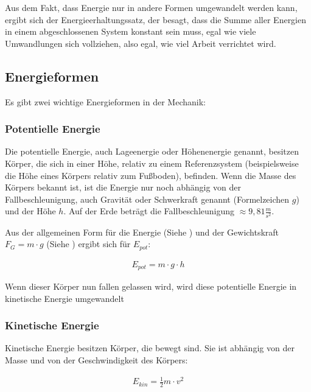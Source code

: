 Aus dem Fakt, dass Energie nur in andere Formen umgewandelt werden kann, ergibt sich der Energieerhaltungssatz, der besagt, dass die Summe aller Energien in einem abgeschlossenen System konstant sein muss, egal wie viele Umwandlungen sich vollziehen, also egal, wie viel Arbeit verrichtet wird. 


\subsection{Energieformen}	\label{subsec:Energieformen}

Es gibt zwei wichtige Energieformen in der Mechanik:

\subsubsection{Potentielle Energie}

Die potentielle Energie, auch Lageenergie oder Höhenenergie genannt, besitzen Körper, die sich in einer Höhe, relativ zu einem Referenzsystem (beispielsweise die Höhe eines Körpers relativ zum Fußboden), befinden. Wenn die Masse des Körpers bekannt ist, ist die Energie nur noch abhängig von der Fallbeschleunigung, auch Gravität oder Schwerkraft genannt (Formelzeichen $g$) und der Höhe $h$. Auf der Erde beträgt die Fallbeschleunigung $\approx 9,81 \frac{m}{s^2}$.

Aus der allgemeinen Form für die Energie (Siehe ) und der Gewichtskraft $F_G = m \cdot g$ (Siehe ) ergibt sich für $E_{pot}$:

\begin{align} \label{eq:epot}
	E_{pot} = m \cdot g \cdot h
\end{align}

\noindent Wenn dieser Körper nun fallen gelassen wird, wird diese potentielle Energie in kinetische Energie umgewandelt

\subsubsection{Kinetische Energie}

Kinetische Energie besitzen Körper, die bewegt sind. Sie ist abhängig von der Masse und von der Geschwindigkeit des Körpers:

\begin{align} \label{eq:ekin}
	E_{kin} = \frac{1}{2} m \cdot v^2
\end{align}

